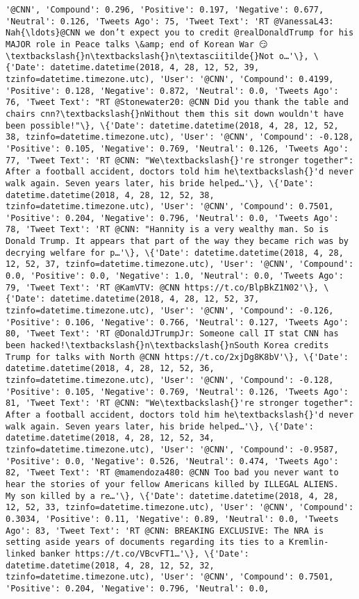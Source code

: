 \documentclass[11pt]{article}
\begin{document}
\begin{Verbatim}[commandchars=\\\{\}]
'@CNN', 'Compound': 0.296, 'Positive': 0.197, 'Negative': 0.677, 'Neutral': 0.126, 'Tweets Ago': 75, 'Tweet Text': 'RT @VanessaL43: Nah{\ldots}@CNN we don’t expect you to credit @realDonaldTrump for his MAJOR role in Peace talks \&amp; end of Korean War 😏\textbackslash{}n\textbackslash{}n\textasciitilde{}Not o…'\}, \{'Date': datetime.datetime(2018, 4, 28, 12, 52, 39, tzinfo=datetime.timezone.utc), 'User': '@CNN', 'Compound': 0.4199, 'Positive': 0.128, 'Negative': 0.872, 'Neutral': 0.0, 'Tweets Ago': 76, 'Tweet Text': "RT @Stonewater20: @CNN Did you thank the table and chairs cnn?\textbackslash{}nWithout them this sit down wouldn't have been possible!"\}, \{'Date': datetime.datetime(2018, 4, 28, 12, 52, 38, tzinfo=datetime.timezone.utc), 'User': '@CNN', 'Compound': -0.128, 'Positive': 0.105, 'Negative': 0.769, 'Neutral': 0.126, 'Tweets Ago': 77, 'Tweet Text': 'RT @CNN: "We\textbackslash{}'re stronger together": After a football accident, doctors told him he\textbackslash{}'d never walk again. Seven years later, his bride helped…'\}, \{'Date': datetime.datetime(2018, 4, 28, 12, 52, 38, tzinfo=datetime.timezone.utc), 'User': '@CNN', 'Compound': 0.7501, 'Positive': 0.204, 'Negative': 0.796, 'Neutral': 0.0, 'Tweets Ago': 78, 'Tweet Text': 'RT @CNN: "Hannity is a very wealthy man. So is Donald Trump. It appears that part of the way they became rich was by decrying welfare for p…'\}, \{'Date': datetime.datetime(2018, 4, 28, 12, 52, 37, tzinfo=datetime.timezone.utc), 'User': '@CNN', 'Compound': 0.0, 'Positive': 0.0, 'Negative': 1.0, 'Neutral': 0.0, 'Tweets Ago': 79, 'Tweet Text': 'RT @KamVTV: @CNN https://t.co/BlpBkZ1N02'\}, \{'Date': datetime.datetime(2018, 4, 28, 12, 52, 37, tzinfo=datetime.timezone.utc), 'User': '@CNN', 'Compound': -0.126, 'Positive': 0.106, 'Negative': 0.766, 'Neutral': 0.127, 'Tweets Ago': 80, 'Tweet Text': 'RT @DonaldJTrumpJr: Someone call IT stat CNN has been hacked!\textbackslash{}n\textbackslash{}nSouth Korea credits Trump for talks with North @CNN https://t.co/2xjDg8K8bV'\}, \{'Date': datetime.datetime(2018, 4, 28, 12, 52, 36, tzinfo=datetime.timezone.utc), 'User': '@CNN', 'Compound': -0.128, 'Positive': 0.105, 'Negative': 0.769, 'Neutral': 0.126, 'Tweets Ago': 81, 'Tweet Text': 'RT @CNN: "We\textbackslash{}'re stronger together": After a football accident, doctors told him he\textbackslash{}'d never walk again. Seven years later, his bride helped…'\}, \{'Date': datetime.datetime(2018, 4, 28, 12, 52, 34, tzinfo=datetime.timezone.utc), 'User': '@CNN', 'Compound': -0.9587, 'Positive': 0.0, 'Negative': 0.526, 'Neutral': 0.474, 'Tweets Ago': 82, 'Tweet Text': 'RT @mamendoza480: @CNN Too bad you never want to hear the stories of your fellow Americans killed by ILLEGAL ALIENS.  My son killed by a re…'\}, \{'Date': datetime.datetime(2018, 4, 28, 12, 52, 33, tzinfo=datetime.timezone.utc), 'User': '@CNN', 'Compound': 0.3034, 'Positive': 0.11, 'Negative': 0.89, 'Neutral': 0.0, 'Tweets Ago': 83, 'Tweet Text': 'RT @CNN: BREAKING EXCLUSIVE: The NRA is setting aside years of documents regarding its ties to a Kremlin-linked banker https://t.co/VBcvFT1…'\}, \{'Date': datetime.datetime(2018, 4, 28, 12, 52, 32, tzinfo=datetime.timezone.utc), 'User': '@CNN', 'Compound': 0.7501, 'Positive': 0.204, 'Negative': 0.796, 'Neutral': 0.0, 
\end{Verbatim}
\end{document}
